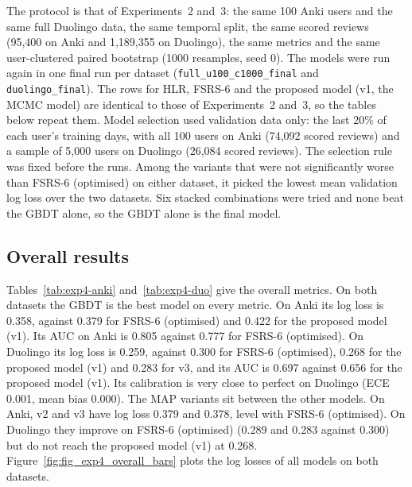 The protocol is that of Experiments~2 and~3: the same 100 Anki users and the same full Duolingo data, the same
temporal split, the same scored reviews (95,400 on Anki and 1,189,355 on Duolingo), the same metrics and the same
user-clustered paired bootstrap (1000 resamples, seed 0). The models were run again in one final run per dataset
(\texttt{full\_u100\_c1000\_final} and \texttt{duolingo\_final}). The rows for HLR, FSRS-6 and the proposed model (v1,
the MCMC model) are identical to those of Experiments~2 and~3, so the tables below repeat them. Model selection used
validation data only: the last 20\% of each user's training days, with all 100 users on Anki (74,092 scored
reviews) and a sample of 5,000 users on Duolingo (26,084 scored reviews). The selection rule was fixed before the runs. Among
the variants that were not significantly worse than FSRS-6 (optimised) on either dataset, it picked the lowest mean
validation log loss over the two datasets. Six stacked combinations were tried and none beat the GBDT alone, so the
GBDT alone is the final model.

\subsection{Overall results}
\label{sec:results-exp4-overall}

Tables~\ref{tab:exp4-anki} and~\ref{tab:exp4-duo} give the overall metrics. On both datasets the GBDT is the best
model on every metric. On Anki its log loss is 0.358, against 0.379 for FSRS-6 (optimised) and 0.422 for the proposed
model (v1). Its AUC on Anki is 0.805 against 0.777 for FSRS-6 (optimised). On Duolingo its log loss is 0.259, against
0.300 for FSRS-6 (optimised), 0.268 for the proposed model (v1) and 0.283 for v3, and its AUC is 0.697 against 0.656
for the proposed model (v1). Its calibration is very close to perfect on Duolingo (ECE 0.001, mean bias 0.000).
The MAP variants sit between the other models. On Anki, v2 and v3 have log loss 0.379 and 0.378, level with FSRS-6
(optimised). On Duolingo they improve on FSRS-6 (optimised) (0.289 and 0.283 against 0.300) but do not reach the proposed
model (v1) at 0.268. Figure~\ref{fig:fig_exp4_overall_bars} plots the log
losses of all models on both datasets.


